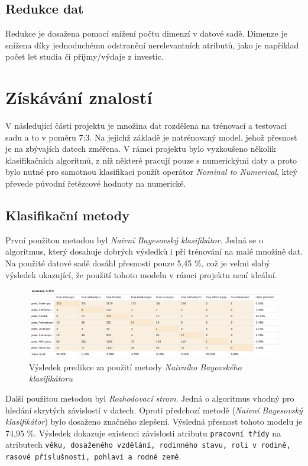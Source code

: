 \documentclass[11pt,a4paper,titlepage]{article}
\begin{document}
        \subsection{Redukce dat}
            Redukce je dosažena pomocí snížení počtu dimenzí v datové sadě. Dimenze je snížena díky jednoduchému odstranění nerelevantních atributů, jako je například
            počet let studia či příjmy/výdaje z investic.
    
    \section{Získávání znalostí}
        V následující části projektu je množina dat rozdělena na trénovací a testovací sadu a to v poměru 7:3. Na jejichž základě je natrénovaný model, jehož přesnost je na zbývajích datech změřena. V rámci projektu bylo vyzkoušeno několik klasifikačních algoritmů, z níž některé pracují pouze s numerickými daty a proto bylo nutné pro samotnou klasifikaci použít operátor \textit{Nominal to Numerical}, kteý převede původní řetězcové hodnoty na numerické.

        \subsection{Klasifikační metody}
            První použitou metodou byl \textit{Naivní Bayesovský klasifikátor}. Jedná se o algoritmus, který dosahuje dobrých výsledků i při trénování na malé množině dat. Na použité datové sadě dosáhl přesnosti pouze 5,45 \%, což je velmi slabý výsledek ukazující, že použití tohoto modelu v rámci projektu není ideální.
            
            \begin{figure}[H]
                \centering
                \includegraphics[width=1\textwidth]{./img/presnost_bayes.png}
                \caption{Výsledek predikce za použití metody \textit{Naivního Bayovského klasifikátoru}}
            \end{figure}

            Další použitou metodou byl \textit{Rozhodovací strom}. Jedná o algoritmus vhodný pro hledání skrytých závislostí v datech. Oproti předchozí metodě (\textit{Naivní Bayesovský klasifikátor}) bylo dosaženo značného zlepšení. Výsledná přesnost tohoto modelu je 74,95 \%. Výsledek dokazuje existenci závislosti atributu \texttt{pracovní třídy} na atributech \texttt{věku, dosaženého vzdělání, rodinného stavu, roli v rodině, rasové příslušnosti, pohlaví a rodné země}.
            
\end{document}
